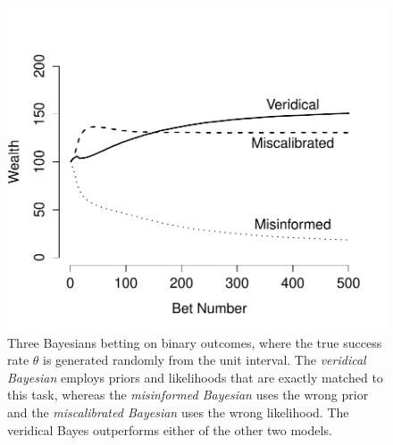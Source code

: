 \begin{figure}[t]
	\centering
	\small
	\hspace*{.5cm}
	\includegraphics[width=.33\textwidth]{other_figs/threeBayes.pdf}
	\vspace*{6pt}
	\caption{Three Bayesians betting on binary outcomes, where the true success rate $\theta$ is generated randomly from the unit interval. The {\it veridical Bayesian} employs priors and likelihoods that are exactly matched to this task, whereas the {\it misinformed Bayesian} uses the wrong prior and the {\it miscalibrated Bayesian} uses the wrong likelihood. The veridical Bayes outperforms either of the other two models.}
	\label{fig:threeBayes}
	\vspace*{-3mm}
\end{figure}

